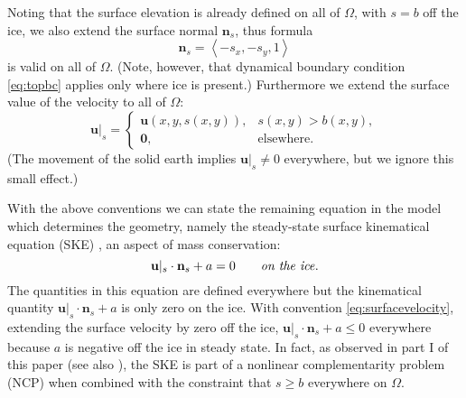 \documentclass[letterpaper,final,12pt,reqno]{amsart}
\theoremstyle{claim}
\newcommand{\bn}{\mathbf{n}}
\newcommand{\bu}{\mathbf{u}}
\newcommand{\bzero}{\bm{0}}
\numberwithin{equation}{section}
\numberwithin{figure}{section}
\numberwithin{table}{section}
\numberwithin{theorem}{section}
\begin{document}
Noting that the surface elevation is already defined on all of $\Omega$, with $s=b$ off the ice, we also extend the surface normal $\bn_s$, thus formula
\begin{equation}
\bn_s = \left<-s_x,-s_y,1\right> \label{eq:surfacenormal}
\end{equation}
is valid on all of $\Omega$.  (Note, however, that dynamical boundary condition \eqref{eq:topbc} applies only where ice is present.)  Furthermore we extend the surface value of the velocity to all of $\Omega$:
\newcommand{\us}{\bu|_s}
\begin{equation}
\bu|_s = \begin{cases} \bu(x,y,s(x,y)), & s(x,y) > b(x,y), \\
                       \bzero, & \text{elsewhere}. \end{cases} \label{eq:surfacevelocity}
\end{equation}
(The movement of the solid earth implies $\us\ne 0$ everywhere, but we ignore this small effect.)

With the above conventions we can state the remaining equation in the model which determines the geometry, namely the steady-state surface kinematical equation (SKE) \cite{GreveBlatter2009}, an aspect of mass conservation:
\begin{equation}
\bu|_s \cdot \bn_s + a = 0 \qquad \text{\emph{on the ice}}. \label{eq:ske}
\end{equation}
The quantities in this equation are defined everywhere but the kinematical quantity $\bu|_s \cdot \bn_s + a$ is only zero on the ice.  With convention \eqref{eq:surfacevelocity}, extending the surface velocity by zero off the ice, $\bu|_s \cdot \bn_s + a \le 0$ everywhere because $a$ is negative off the ice in steady state.  In fact, as observed in part I of this paper \cite{Bueler2022partI} (see also \cite{Bueler2021conservation}), the SKE is part of a nonlinear complementarity problem (NCP) when combined with the constraint that $s\ge b$ everywhere on $\Omega$.
\end{document}
